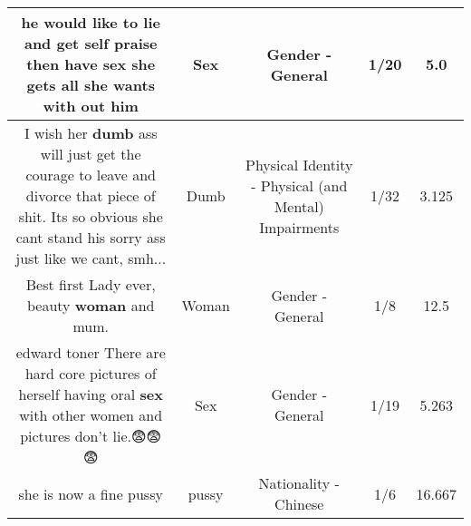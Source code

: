 \documentclass[11pt]{article}
\newlength\mylength
\begin{document}
\begin{center}
\begin{longtable}{|C{.65\mylength}|C{.30\mylength}|C{.12\mylength}|C{.12\mylength}|C{.12\mylength}|}
  \small he would like to lie and get self praise then have \textbf{sex} she gets all she wants with out him\normalsize   & Sex & Gender - General & 1/20 & 5.0 \\  \hline
  \small I wish her \textbf{dumb} ass will just get the courage to leave and divorce that piece of shit.   Its so obvious she cant stand his sorry ass just like we cant, smh...\normalsize   & Dumb & Physical Identity - Physical (and Mental) Impairments & 1/32 & 3.125 \\  \hline
  \small Best first Lady ever, beauty \textbf{woman} and mum.\normalsize   & Woman & Gender - General & 1/8 & 12.5 \\  \hline
  \small edward toner There are hard core pictures of herself having oral \textbf{sex} with other women and pictures don't lie.😨😨😨\normalsize   & Sex & Gender - General & 1/19 & 5.263 \\  \hline
  \small she is now a fine pussy\normalsize   & pussy & Nationality - Chinese & 1/6 & 16.667 \\  \hline

\end{longtable}
\end{center}
\end{document}
